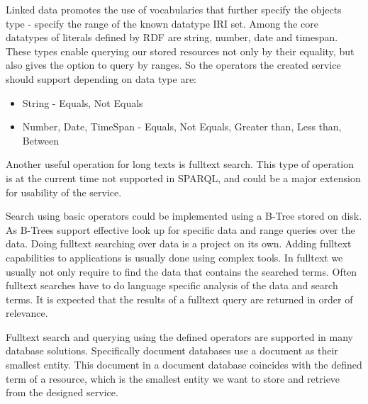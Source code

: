 Linked data promotes the use of vocabularies %
that further specify the objects type - specify the range of the known datatype IRI set.
Among the core datatypes of literals defined by RDF are string, number, date and timespan. These types enable querying our stored resources not only by their equality, but also gives the option to query by ranges. So the operators the created service should support depending on data type are:
\begin{itemize}
	\item String - Equals, Not Equals
	\item Number, Date, TimeSpan - Equals, Not Equals, Greater than, Less than, Between
\end{itemize}
Another useful operation for long texts is fulltext search. %
This type of operation is at the current time not supported in SPARQL, and could be a major extension for usability of the service.

Search using basic operators could be implemented using a B-Tree stored on disk. As B-Trees support effective look up for specific data and range queries over the data.
Doing fulltext searching over data is a project on its own. Adding fulltext capabilities to applications is usually done using complex tools. In fulltext we usually not only require to find the data that contains the searched terms. Often fulltext searches have to do language specific analysis of the data and search terms. It is expected that the results of a fulltext query are returned in order of relevance.

Fulltext search and querying using the defined operators are supported in many database solutions. Specifically document databases use a document as their smallest entity. This document in a document database coincides with the defined term of a resource, which is the smallest entity we want to store and retrieve from the designed service.

